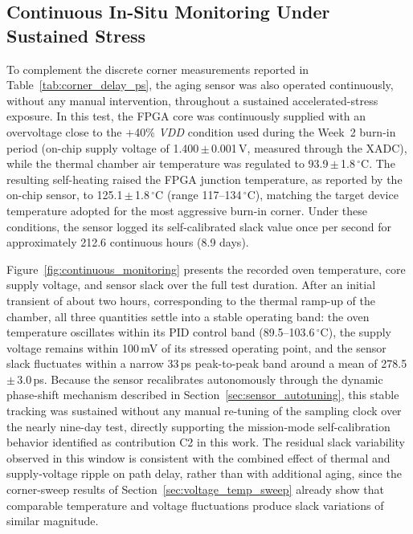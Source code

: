 \documentclass[a4paper,10pt,twoside,twocolumn,final]{JICS_LaTexGuidelines}
\begin{document}
\subsection{Continuous In-Situ Monitoring Under Sustained Stress}
\label{sec:continuous_monitoring}

To complement the discrete corner measurements reported in Table~\ref{tab:corner_delay_ps}, the aging sensor was also operated continuously, without any manual intervention, throughout a sustained accelerated-stress exposure. In this test, the FPGA core was continuously supplied with an overvoltage close to the \mbox{+40\%} \textit{VDD} condition used during the Week~2 burn-in period (on-chip supply voltage of 1.400\,$\pm$\,0.001\,V, measured through the XADC), while the thermal chamber air temperature was regulated to 93.9\,$\pm$\,1.8\,$^{\circ}$C. The resulting self-heating raised the FPGA junction temperature, as reported by the on-chip sensor, to 125.1\,$\pm$\,1.8\,$^{\circ}$C (range 117--134\,$^{\circ}$C), matching the target device temperature adopted for the most aggressive burn-in corner. Under these conditions, the sensor logged its self-calibrated slack value once per second for approximately 212.6 continuous hours (8.9 days).

Figure~\ref{fig:continuous_monitoring} presents the recorded oven temperature, core supply voltage, and sensor slack over the full test duration. After an initial transient of about two hours, corresponding to the thermal ramp-up of the chamber, all three quantities settle into a stable operating band: the oven temperature oscillates within its PID control band (89.5--103.6\,$^{\circ}$C), the supply voltage remains within 100\,mV of its stressed operating point, and the sensor slack fluctuates within a narrow 33\,ps peak-to-peak band around a mean of 278.5\,$\pm$\,3.0\,ps. Because the sensor recalibrates autonomously through the dynamic phase-shift mechanism described in Section~\ref{sec:sensor_autotuning}, this stable tracking was sustained without any manual re-tuning of the sampling clock over the nearly nine-day test, directly supporting the mission-mode self-calibration behavior identified as contribution C2 in this work. The residual slack variability observed in this window is consistent with the combined effect of thermal and supply-voltage ripple on path delay, rather than with additional aging, since the corner-sweep results of Section~\ref{sec:voltage_temp_sweep} already show that comparable temperature and voltage fluctuations produce slack variations of similar magnitude.
\end{document}
